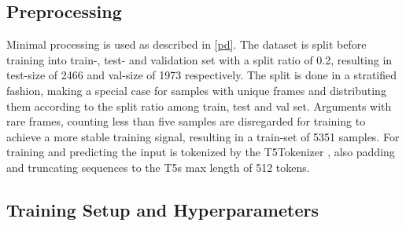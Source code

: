 \documentclass[11pt,a4paper,onecolumn,oneside,notitlepage]{article}
\begin{document}
\subsection{Preprocessing}
Minimal processing is used as described in  \ref{pd}. The dataset is split before training into train-, test- and validation set with a split ratio of \num{0.2}, resulting in test-size of \num{2466} and val-size of \num{1973} respectively. The split is done in a stratified fashion, making a special case for samples with unique frames and distributing them according to the split ratio among train, test and val set. Arguments with rare frames, counting less than five samples are disregarded for training to achieve a more stable training signal, resulting in a train-set of \num{5351} samples. For training and predicting the input is tokenized by the T5Tokenizer \citep{wolf-etal-2020-transformers}, also padding and truncating sequences to the T5s max length of \num{512} tokens. 

\subsection{Training Setup and Hyperparameters}
\end{document}
